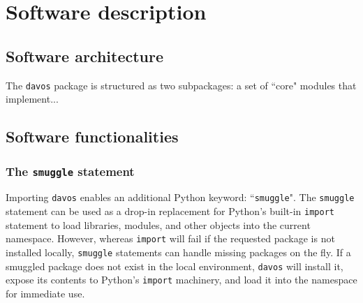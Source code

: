 \documentclass[preprint,12pt, a4paper]{elsarticle}
\newcommand{\comment}[1]{}
\begin{document}



\section{Software description}


\subsection{Software architecture}
The \texttt{davos} package is structured as two subpackages: a set of ``core" modules that implement...



\subsection{Software functionalities}%

\subsubsection{The \texttt{smuggle} statement}
Importing \texttt{davos}\comment{in a Jupyter notebook} enables an additional Python keyword: ``\texttt{smuggle}".
The \texttt{smuggle} statement can be used as a drop-in replacement for Python's built-in \texttt{import} statement to load libraries, modules, and other objects into the current namespace.
However, whereas \texttt{import} will fail if the requested package is not installed locally, \texttt{smuggle} statements can handle missing packages on the fly.
If a smuggled package does not exist in the local environment, \texttt{davos} will install it, expose its contents to Python's \texttt{import} machinery, and load it into the namespace for immediate use.
\end{document}
